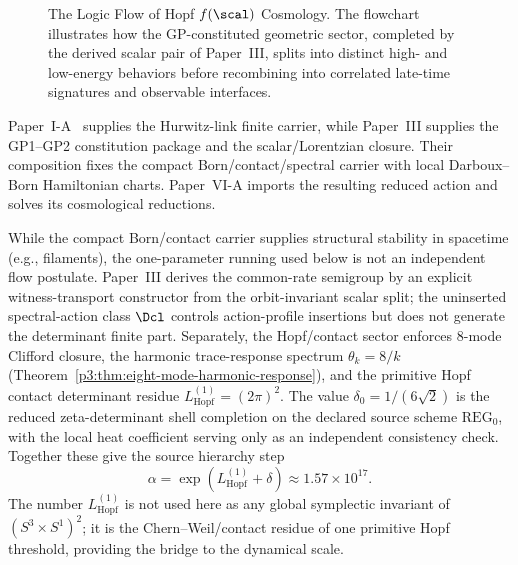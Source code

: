 \documentclass[12pt,a4paper]{article}
\begin{document}
\begin{figure}[H]
{%
}
\caption{The Logic Flow of Hopf $f(\scal)$ Cosmology. The flowchart illustrates how the GP-constituted geometric sector, completed by the derived scalar pair of Paper~III, splits into distinct high- and low-energy behaviors before recombining into correlated late-time signatures and observable interfaces.}
\label{p8:fig:flowchart-improved}
\end{figure}


Paper~I-A~\cite{Kugelmann2026a} supplies the Hurwitz-link finite carrier, while Paper~III supplies the GP1--GP2 constitution package and the scalar/Lorentzian closure.  Their composition fixes the compact Born/contact/spectral carrier with local Darboux--Born Hamiltonian charts.  Paper~VI-A imports the resulting reduced action and solves its cosmological reductions.

While the compact Born/contact carrier supplies structural stability in spacetime (e.g., filaments), the one-parameter running used below is not an independent flow postulate.  Paper~III derives the common-rate semigroup by an explicit witness-transport constructor from the orbit-invariant scalar split; the uninserted spectral-action class $\Dcl$ controls action-profile insertions but does not generate the determinant finite part.  Separately, the Hopf/contact sector enforces 8-mode Clifford closure, the harmonic trace-response spectrum $\theta_k = 8/k$ (Theorem~\ref{p3:thm:eight-mode-harmonic-response}), and the primitive Hopf contact determinant residue $L_{\mathrm{Hopf}}^{(1)}=(2\pi)^2$.  The value $\delta_0 = 1/(6\sqrt{2})$ is the reduced zeta-determinant shell completion on the declared source scheme $\mathrm{REG}_0$, with the local heat coefficient serving only as an independent consistency check.  Together these give the source hierarchy step
\[
\alpha = \exp(L_{\mathrm{Hopf}}^{(1)} + \delta) \approx 1.57 \times 10^{17}.
\]
 The number $L_{\mathrm{Hopf}}^{(1)}$ is not used here as any global symplectic invariant of $(S^3\times S^1)^2$; it is the Chern--Weil/contact residue of one primitive Hopf threshold, providing the bridge to the dynamical scale.
\end{document}

